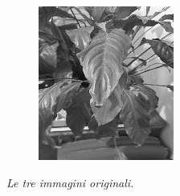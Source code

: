 \documentclass{article}
\begin{document}
\begin{figure}[H]
\begin{subfigure}[b]{0.29\textwidth}
    \end{subfigure}
    \begin{subfigure}[b]{0.29\textwidth}
        \centering
        \includegraphics[width=\textwidth]{../plant.png}
    \end{subfigure}
    \caption{\emph{Le tre immagini originali.}}
    \label{fig:immagini_originali}
\end{figure}
\end{document}
